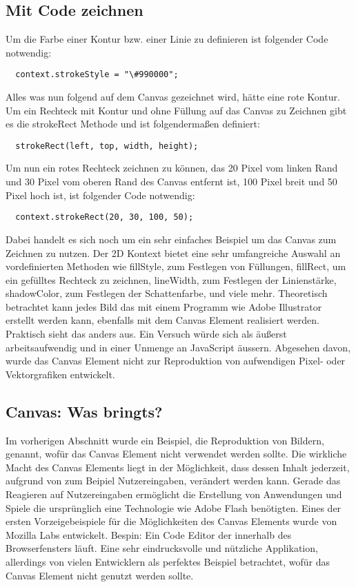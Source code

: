 \subsection{Mit Code zeichnen}
Um die Farbe einer Kontur bzw. einer Linie zu definieren ist folgender Code
notwendig:
%
\begin{lstlisting}
  context.strokeStyle = "\#990000";
\end{lstlisting}
%
Alles was nun folgend auf dem Canvas gezeichnet wird, hätte eine rote Kontur.
Um ein Rechteck mit Kontur und ohne Füllung auf das Canvas zu Zeichnen gibt es
die strokeRect Methode und ist folgendermaßen definiert:
%
\begin{lstlisting}
  strokeRect(left, top, width, height);
\end{lstlisting}
%
Um nun ein rotes Rechteck zeichnen zu können, das 20 Pixel vom linken Rand und
30 Pixel vom oberen Rand des Canvas entfernt ist, 100 Pixel breit und 50 Pixel
hoch ist, ist folgender Code notwendig:
%
\begin{lstlisting}
  context.strokeRect(20, 30, 100, 50);
\end{lstlisting}
%
Dabei handelt es sich noch um ein sehr einfaches Beispiel um das Canvas zum
Zeichnen zu nutzen. Der 2D Kontext bietet eine sehr umfangreiche Auswahl an
vordefinierten Methoden wie fillStyle, zum Festlegen von Füllungen, fillRect,
um ein gefülltes Rechteck zu zeichnen, lineWidth, zum Festlegen der
Linienstärke, shadowColor, zum Festlegen der Schattenfarbe, und viele mehr.
Theoretisch betrachtet kann jedes Bild das mit einem Programm wie Adobe
Illustrator erstellt werden kann, ebenfalls mit dem Canvas Element realisiert
werden. Praktisch sieht das anders aus. Ein Versuch würde sich als
äußerst arbeitsaufwendig und in einer Unmenge an JavaScript äussern.
Abgesehen davon, wurde das Canvas Element nicht zur Reproduktion von
aufwendigen Pixel- oder Vektorgrafiken entwickelt.

\subsection{Canvas: Was bringts?}
Im vorherigen Abschnitt wurde ein Beispiel, die Reproduktion von Bildern,
genannt, wofür das Canvas Element nicht verwendet werden sollte. Die wirkliche
Macht des Canvas Elements liegt in der Möglichkeit, dass dessen Inhalt
jederzeit, aufgrund von zum Beipiel Nutzereingaben, verändert werden kann.
Gerade das Reagieren auf Nutzereingaben ermöglicht die Erstellung von
Anwendungen und Spiele die ursprünglich eine Technologie wie Adobe Flash
benötigten.
\newline
Eines der ersten Vorzeigebeispiele für die Möglichkeiten des Canvas Elements
wurde von Mozilla Labs entwickelt. Bespin: Ein Code Editor der innerhalb des
Browserfensters läuft. %
Eine sehr eindrucksvolle und nützliche Applikation, allerdings von vielen
Entwicklern als perfektes Beispiel betrachtet, wofür das Canvas Element nicht
genutzt werden sollte.


